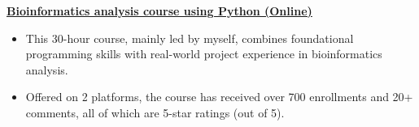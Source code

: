 \textbf{\href{https://www.bioinfo.info/p/t_pc/goods_pc_detail/goods_detail/course_2SvfNlIVzrKfOcexHk9Nute5Bhd}{Bioinformatics analysis course using Python (Online)}}
\begin{itemize}
    \item This 30-hour course, mainly led by myself, combines foundational programming skills with real-world project experience in bioinformatics analysis. 
    \item Offered on 2 platforms, the course has received over 700 enrollments and 20+ comments, all of which are 5-star ratings (out of 5).
\end{itemize}